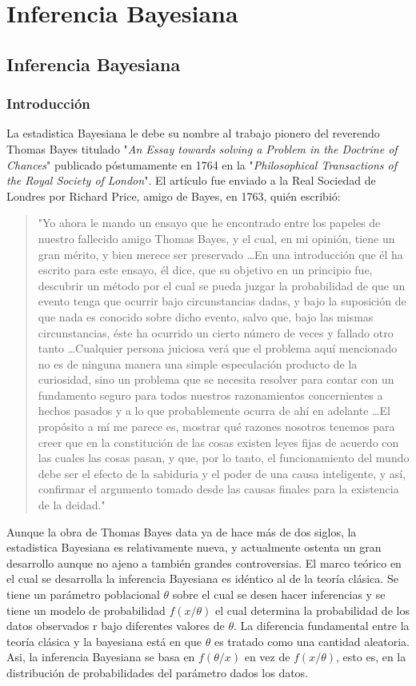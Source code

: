 \part{Inferencia Bayesiana}

\chapter{Inferencia Bayesiana}

\section{Introducción}
La estadistica Bayesiana le debe su nombre al trabajo pionero del reverendo Thomas Bayes titulado "\textit{An Essay towards solving a Problem in the Doctrine of Chances}" publicado póstumamente en 1764 en la "\textit{Philosophical Transactions of the Royal Society of London}". El artículo fue enviado a la Real Sociedad de Londres por Richard Price, amigo de Bayes, en 1763, quién escribió:
\blockquote{"Yo ahora le mando un ensayo que he encontrado entre los papeles de nuestro fallecido amigo Thomas Bayes, y el cual, en mi opinión, tiene un gran mérito, y bien merece ser preservado \ldots En una introducción que él ha escrito para este ensayo, él dice, que su objetivo en un principio fue, descubrir un método por el cual se pueda juzgar la probabilidad de que un evento tenga que ocurrir bajo circunstancias dadas, y bajo la suposición de que nada es conocido sobre dicho evento, salvo que, bajo las mismas circunstancias, éste ha ocurrido un cierto número de veces y fallado otro tanto \ldots Cualquier persona juiciosa verá que el problema aquí mencionado no es de ninguna manera una simple especulación producto de la curiosidad, sino un problema que se necesita resolver para contar con un fundamento seguro para todos nuestros razonamientos concernientes a hechos pasados y a lo que probablemente ocurra de ahí en adelante \ldots El propósito a mí me parece es, mostrar qué razones nosotros tenemos para creer que en la constitución de las cosas existen leyes fijas de acuerdo con las cuales las cosas pasan, y que, por lo tanto, el funcionamiento del mundo debe ser el efecto de la sabiduria y el poder de una causa inteligente, y así, confirmar el argumento tomado desde las causas finales para la existencia de la deidad."}
Aunque la obra de Thomas Bayes data ya de hace más de dos siglos, la estadistica Bayesiana es relativamente nueva, y actualmente ostenta un gran desarrollo aunque no ajeno a también grandes controversias. El marco teórico en el cual se desarrolla la inferencia Bayesiana es idéntico al de la teoría clásica. Se tiene un parámetro poblacional $\theta$ sobre el cual se desen hacer inferencias y se tiene un modelo de probabilidad $f(x/\theta)$ el cual determina la probabilidad de los datos observados r bajo diferentes valores de $\theta$. La diferencia fundamental entre la teoría clásica y la bayesiana está en que $\theta$ es tratado como una cantidad aleatoria. Asi, la inferencia Bayesiana se basa en $f(\theta / x)$ en vez de $f(x/ \theta)$, esto es, en la distribución de probabilidades del parámetro dados los datos.

